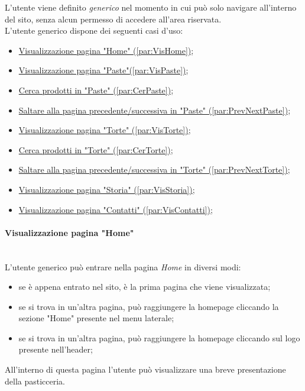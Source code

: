 L'utente viene definito \emph{generico} nel momento in cui può solo navigare all'interno del sito, senza alcun permesso di accedere all'area riservata.\\
L'utente generico dispone dei seguenti casi d'uso:
\begin{itemize}
	\item \hyperref[par:VisHome]{ Visualizzazione pagina "Home" (\ref{par:VisHome})};
	\item \hyperref[par:VisPaste]{ Visualizzazione pagina "Paste"(\ref{par:VisPaste})};
	\item \hyperref[par:CerPaste]{ Cerca prodotti in "Paste" (\ref{par:CerPaste})};
	\item \hyperref[par:PrevNextPaste]{ Saltare alla pagina precedente/successiva in "Paste" (\ref{par:PrevNextPaste})};
	\item \hyperref[par:VisTorte]{ Visualizzazione pagina "Torte" (\ref{par:VisTorte})};
	\item \hyperref[par:CerTorte]{ Cerca prodotti in "Torte" (\ref{par:CerTorte})};
	\item \hyperref[par:PrevNextTorte]{ Saltare alla pagina precedente/successiva in "Torte" (\ref{par:PrevNextTorte})};
	\item \hyperref[par:VisStoria]{ Visualizzazione pagina "Storia" (\ref{par:VisStoria})};
	\item \hyperref[par:VisContatti]{ Visualizzazione pagina "Contatti" (\ref{par:VisContatti})};
\end{itemize}

\paragraph{Visualizzazione pagina "Home"}\mbox{}\\
\label{par:VisHome}
L'utente generico può entrare nella pagina \emph{Home} in diversi modi:
\begin{itemize}
	\item se è appena entrato nel sito, è la prima pagina che viene visualizzata;
	\item se si trova in un'altra pagina, può raggiungere la homepage cliccando la sezione "Home" presente nel menu laterale;
	\item se si trova in un'altra pagina, può raggiungere la homepage cliccando sul logo presente nell'header;
\end{itemize}
All'interno di questa pagina l'utente può visualizzare una breve presentazione della pasticceria.\\

